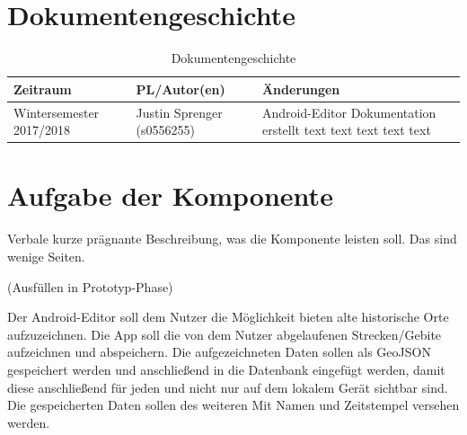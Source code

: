 \usepackage{url}
\usepackage{graphicx}
\section{Dokumentengeschichte}
\begin{table}[h]
 \begin{tabular}{|l|l|p{4cm}|}
 \hline
 Zeitraum & PL/Autor(en) & Änderungen \\
 \hline
 Wintersemester 2017/2018 & Justin Sprenger (s0556255) & 
Android-Editor Dokumentation erstellt \newline 
text \newline 
text \newline 
text \newline 
text \newline 
text \newline 
 
  \\
 \hline
 \end{tabular}
 \caption{Dokumentengeschichte}
 \end{table}

\section{Aufgabe der Komponente}
Verbale kurze prägnante Beschreibung, was die Komponente leisten soll.
Das sind wenige Seiten.

(Ausfüllen in Prototyp-Phase) 


Der Android-Editor soll dem Nutzer die Möglichkeit bieten alte historische Orte aufzuzeichnen. Die App soll die von dem Nutzer abgelaufenen Strecken/Gebite aufzeichnen und abspeichern. Die aufgezeichneten Daten sollen als GeoJSON gespeichert werden und anschließend in die Datenbank eingefügt werden, damit diese anschließend für jeden und nicht nur auf dem lokalem Gerät sichtbar sind. Die gespeicherten Daten sollen des weiteren Mit Namen und Zeitstempel versehen werden.

